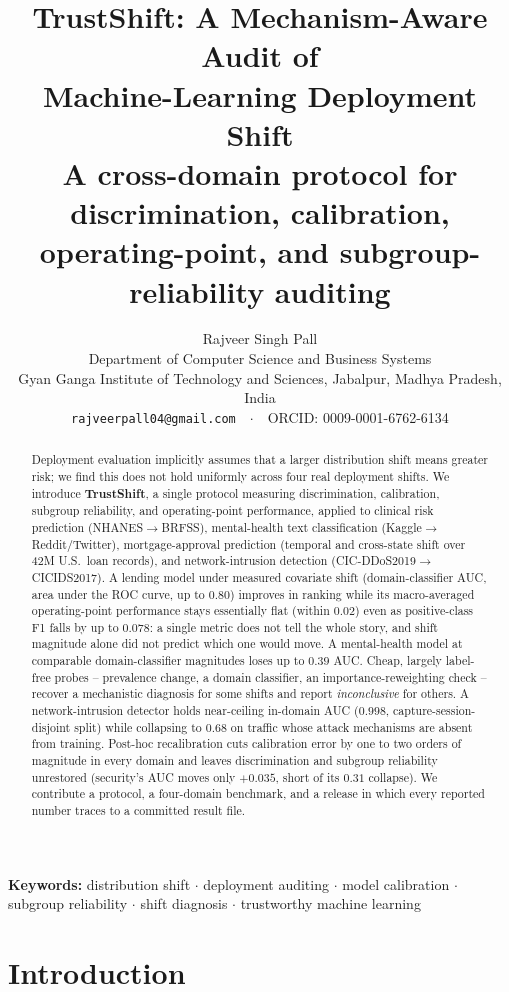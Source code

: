 \documentclass[11pt]{article}
\title{\textbf{TrustShift: A Mechanism-Aware Audit of\\
Machine-Learning Deployment Shift}\\
\large A cross-domain protocol for discrimination, calibration, operating-point, and
subgroup-reliability auditing}
\author{Rajveer Singh Pall\\[2pt]
\normalsize Department of Computer Science and Business Systems\\
\normalsize Gyan Ganga Institute of Technology and Sciences, Jabalpur, Madhya Pradesh, India\\
\normalsize \texttt{rajveerpall04@gmail.com}\ \ $\cdot$\ \ ORCID: 0009-0001-6762-6134}
\date{}
\begin{document}
\maketitle

\begin{abstract}
\noindent Deployment evaluation implicitly assumes that a larger distribution shift means greater
risk; we find this does not hold uniformly across four real deployment shifts. We introduce
\textbf{TrustShift}, a single protocol measuring discrimination, calibration, subgroup reliability,
and operating-point performance, applied to clinical risk prediction (NHANES$\rightarrow$BRFSS),
mental-health text classification (Kaggle$\rightarrow$Reddit/Twitter), mortgage-approval prediction
(temporal and cross-state shift over 42M U.S.\ loan records), and network-intrusion detection
(CIC-DDoS2019$\rightarrow$CICIDS2017). A lending model under measured covariate shift
(domain-classifier AUC, area under the ROC curve, up to $0.80$) improves in ranking while its macro-averaged
operating-point performance stays essentially flat (within $0.02$) even as positive-class F1
falls by up to $0.078$: a single metric does not tell the whole story, and shift magnitude
alone did not predict which one would move. A mental-health model at comparable domain-classifier
magnitudes loses up to $0.39$ AUC. Cheap, largely label-free probes -- prevalence change, a domain
classifier, an importance-reweighting check -- recover a mechanistic diagnosis for some shifts and
report \emph{inconclusive} for others. A network-intrusion
detector holds
near-ceiling in-domain AUC ($0.998$, capture-session-disjoint split) while collapsing to $0.68$ on
traffic whose attack mechanisms are absent from training. Post-hoc
recalibration cuts calibration error by one to two orders of magnitude in every domain and
leaves discrimination and subgroup reliability unrestored (security's AUC moves only
$+0.035$, short of its $0.31$ collapse). We contribute a protocol, a four-domain
benchmark, and a release in which every reported number traces to a committed result file.
\end{abstract}

\noindent\textbf{Keywords:} distribution shift $\cdot$ deployment auditing $\cdot$ model
calibration $\cdot$ subgroup reliability $\cdot$ shift diagnosis $\cdot$ trustworthy machine
learning

\section{Introduction}\label{sec:intro}
\end{document}
